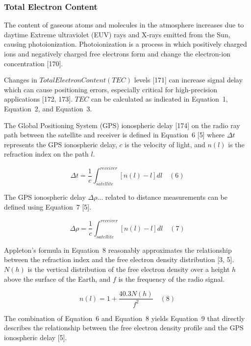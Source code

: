 \documentclass[sn-mathphys-num]{sn-jnl}%
\begin{document}
\subsubsection{Total Electron Content}

The content of gaseous atoms and molecules in the atmosphere increases due to daytime Extreme ultraviolet (EUV) rays and X-rays emitted from the Sun, causing photoionization. Photoionization is a process in which positively charged ions and negatively charged free electrons form and change the electron-ion concentration [170].

Changes in $Total Electron Content (TEC)$ levels [171] can increase signal delay which can cause positioning errors, especially critical for high-precision applications [172, 173]. $TEC$ can be calculated as indicated in Equation~1, Equation~2, and Equation~3. 

The Global Positioning System (GPS) ionospheric delay [174] on the radio ray path between the satellite and receiver is defined in Equation~6 [5] where $\Delta t$ represents the GPS ionospheric delay, $c$ is the velocity of light, and $n(l)$ is the refraction index on the path $l$.

\begin{equation}
	\Delta t = \frac{1}{c} \int_{satellite}^{receiver} \left[ n(l) - l \right]dl
	\quad\left(6\right)
\end{equation}

The GPS ionospheric delay $\Delta \rho \dots$ related to distance measurements can be defined using Equation~7 [5].

\begin{equation}
	\Delta \rho = \frac{1}{c} \int_{satellite}^{receiver} \left[ n(l) - l \right]dl
	\quad\left(7\right)
\end{equation}

Appleton’s formula in Equation~8 reasonably approximates the relationship between the refraction index and the free electron density distribution [3, 5]. $N(h)$ is the vertical distribution of the free electron density over a height $h$ above the surface of the Earth, and $f$ is the frequency of the radio signal.

\begin{equation}
	n(l) = 1 + \frac{40.3 N(h)}{f^{2}}
	\quad\left(8\right)
\end{equation}

The combination of Equation~6 and Equation~8 yields Equation~9 that directly describes the relationship between the free electron density profile and the GPS ionospheric delay [5].
\end{document}
